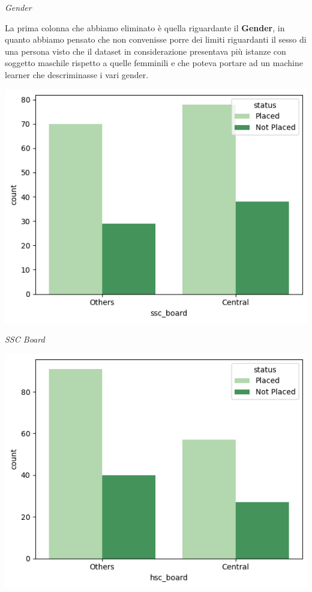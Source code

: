 \documentclass{article}
\begin{document}
\begin{center}
    \textit{Gender}

\end{center}

La prima colonna che abbiamo eliminato è quella riguardante il \textbf{Gender}, in quanto abbiamo pensato che non convenisse porre dei limiti
riguardanti il sesso di una persona visto che il dataset in considerazione presentava più istanze con soggetto maschile rispetto a quelle femminili
e che poteva portare ad un machine learner che descriminasse i vari gender.

\begin{center}

    \includegraphics[scale=0.5]{sscboard.png}

    \textit{SSC Board}
    
    \includegraphics[scale=0.5]{hscboard.png}


\end{center}
\end{document}
